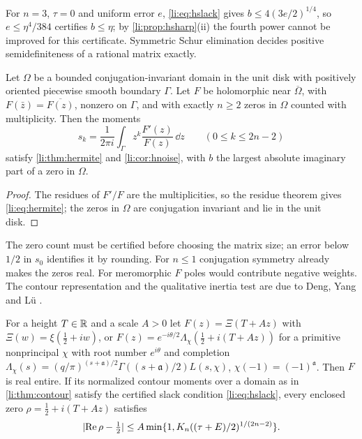 For $n=3$, $\tau=0$ and uniform error $e$, \eqref{li:eq:hslack} gives $b\le4(3e/2)^{1/4}$, so
$e\le\eta^4/384$ certifies $b\le\eta$; by \cref{li:prop:hsharp}(ii) the fourth power cannot be
improved for this certificate. Symmetric Schur elimination decides positive semidefiniteness of a
rational matrix exactly.

\begin{theorem}\label{li:thm:contour}
Let $\Omega$ be a bounded conjugation-invariant domain in the unit disk with positively oriented
piecewise smooth boundary $\Gamma$. Let $F$ be holomorphic near $\overline\Omega$, with
$F(\bar z)=\overline{F(z)}$, nonzero on $\Gamma$, and with exactly $n\ge2$ zeros in $\Omega$ counted
with multiplicity. Then the moments
\[
 s_k=\frac1{2\pi i}\int_\Gamma z^k\frac{F'(z)}{F(z)}\,\dd z\qquad(0\le k\le2n-2)
\]
satisfy \cref{li:thm:hermite} and \cref{li:cor:hnoise}, with $b$ the largest absolute imaginary
part of a zero in $\Omega$.
\end{theorem}

\begin{proof}
The residues of $F'/F$ are the multiplicities, so the residue theorem gives \eqref{li:eq:hermite};
the zeros in $\Omega$ are conjugation invariant and lie in the unit disk.
\end{proof}

The zero count must be certified before choosing the matrix size; an error below $1/2$ in $s_0$
identifies it by rounding. For $n\le1$ conjugation symmetry already makes the zeros real. For
meromorphic $F$ poles would contribute negative weights. The contour representation and the
qualitative inertia test are due to Deng, Yang and L\"u \cite{DengYangLu2026Contour}.

\begin{corollary}\label{li:cor:hstrip}
For a height $T\in\mathbb{R}$ and a scale $A>0$ let $F(z)=\Xi(T+Az)$ with $\Xi(w)=\xi(\frac12+iw)$, or
$F(z)=e^{-i\theta/2}\Lambda_\chi(\frac12+i(T+Az))$ for a primitive nonprincipal $\chi$ with root number
$e^{i\theta}$ and completion
$\Lambda_\chi(s)=(q/\pi)^{(s+\mathfrak a)/2}\Gamma((s+\mathfrak a)/2)L(s,\chi)$, $\chi(-1)=(-1)^{\mathfrak a}$.
Then $F$ is real entire. If its normalized contour moments over a domain as in
\cref{li:thm:contour} satisfy the certified slack condition \eqref{li:eq:hslack}, every enclosed zero
$\rho=\frac12+i(T+Az)$ satisfies
\[
 \lvert\operatorname{Re}\rho-\tfrac12\rvert\le A\min\{1,K_n((\tau+E)/2)^{1/(2n-2)}\}.
\]
\end{corollary}

